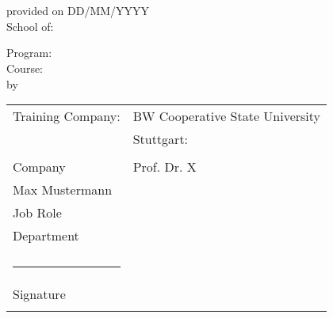 \begin{titlepage}
\vspace*{\fill}
\begin{center}
\vspace{3mm}


\textbf{ %
	\papertitle
	} \\
\vspace{1.5cm}


\papertype \\ %
\vspace{1cm}


provided on DD/MM/YYYY \\ %
\vspace{1cm}
School of: \schoolof  \\
\vspace{0.6cm}

Program: \studyprogram \\ %
\vspace{0.6cm}
Course: \studycourse \\ %
		
\vspace{2.5cm}
by \\
\paperauthor %
\vspace{3cm}

\begin{tabular}[h]{ll}

Training Company:				&	BW Cooperative State University\\
								&	Stuttgart:\\ 
 								&	\\
Company							&	Prof. Dr. X\\
Max Mustermann					&	\\
Job Role				  		&	\\
Department						&	\\
								&	\\
\rule{0.5\textwidth}{1pt}		&	\\				
Signature						&	\\		
								&	\\

\end{tabular}
\end{center}
\vspace*{\fill}
\end{titlepage}